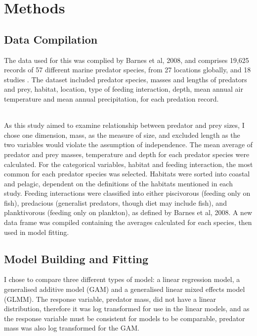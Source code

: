 \documentclass[11pt,a4paper]{article}
\begin{document}
	\section{Methods}
	
	\subsection{Data Compilation}
	
	\par \noindent The data used for this was complied by Barnes et al, 2008, and comprises 19,625 records of 57 different marine predator species, from 27 locations globally, and 18 studies \citep{Barnes2008}. The dataset included predator species, masses and lengths of predators and prey, habitat, location, type of feeding interaction, depth, mean annual air temperature and mean annual precipitation, for each predation record.
	
	\par \noindent ~\\As this study aimed to examine relationship between predator and prey sizes, I chose one dimension, mass, as the measure of size, and excluded length as the two variables would violate the assumption of independence. The mean average of predator and prey masses, temperature and depth for each predator species were calculated. For the categorical variables, habitat and feeding interaction, the most common for each predator species was selected. Habitats were sorted into coastal and pelagic, dependent on the definitions of the habitats mentioned in each study. Feeding interactions were classified into either piscivorous (feeding only on fish), predacious (generalist predators, though diet may include fish), and planktivorous (feeding only on plankton), as defined by Barnes et al, 2008. A new data frame was compiled containing the averages calculated for each species, then used in model fitting.
	
	\subsection{Model Building and Fitting}
	
	\par \noindent I chose to compare three different types of model: a linear regression model, a generalised additive model (GAM) and a generalised linear mixed effects model (GLMM). The response variable, predator mass, did not have a linear distribution, therefore it was log transformed for use in the linear models, and as the response variable must be consistent for models to be comparable, predator mass was also log transformed for the GAM.
	
\end{document}
